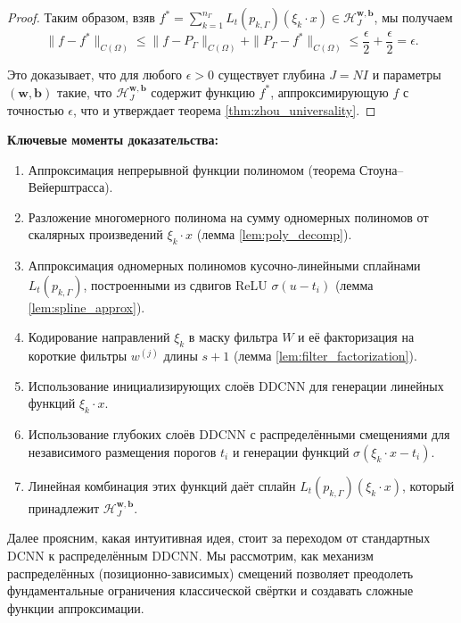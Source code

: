 \documentclass[../NDCNNAI_main.tex]{subfiles}
\begin{document}
\begin{proof}
    Таким образом, взяв $f^* = \sum_{k=1}^{n_\Gamma} L_t(p_{k,\Gamma})(\xi_k \cdot x) \in \mathcal{H}_J^{\mathbf{w},\mathbf{b}}$, мы получаем
    \[
    \|f - f^*\|_{C(\Omega)} \leq \|f - P_\Gamma\|_{C(\Omega)} + \|P_\Gamma - f^*\|_{C(\Omega)} \leq \frac{\epsilon}{2} + \frac{\epsilon}{2} = \epsilon.
    \]

    Это доказывает, что для любого $\epsilon > 0$ существует глубина $J = NI$ и параметры $(\mathbf{w}, \mathbf{b})$ такие, что $\mathcal{H}_J^{\mathbf{w},\mathbf{b}}$ содержит функцию $f^*$, аппроксимирующую $f$ с точностью $\epsilon$, что и утверждает теорема \ref{thm:zhou_universality}.
\end{proof}


\textbf{Ключевые моменты доказательства:}
\begin{enumerate}
    \item Аппроксимация непрерывной функции полиномом (теорема Стоуна–Вейерштрасса).
    \item Разложение многомерного полинома на сумму одномерных полиномов от скалярных произведений $\xi_k \cdot x$ (лемма \ref{lem:poly_decomp}).
    \item Аппроксимация одномерных полиномов кусочно-линейными сплайнами $L_t(p_{k,\Gamma})$, построенными из сдвигов ReLU $\sigma(u - t_i)$ (лемма \ref{lem:spline_approx}).
    \item Кодирование направлений $\xi_k$ в маску фильтра $W$ и её факторизация на короткие фильтры $w^{(j)}$ длины $s+1$ (лемма \ref{lem:filter_factorization}).
    \item Использование инициализирующих слоёв DDCNN для генерации линейных функций $\xi_k \cdot x$.
    \item Использование глубоких слоёв DDCNN с распределёнными смещениями для независимого размещения порогов $t_i$ и генерации функций $\sigma(\xi_k \cdot x - t_i)$.
    \item Линейная комбинация этих функций даёт сплайн $L_t(p_{k,\Gamma})(\xi_k \cdot x)$, который принадлежит $\mathcal{H}_J^{\mathbf{w},\mathbf{b}}$.
\end{enumerate}

Далее проясним, какая интуитивная идея, стоит за переходом от стандартных DCNN к распределённым DDCNN. Мы рассмотрим, как механизм распределённых (позиционно-зависимых) смещений позволяет преодолеть фундаментальные ограничения классической свёртки и создавать сложные функции аппроксимации.
\end{document}
